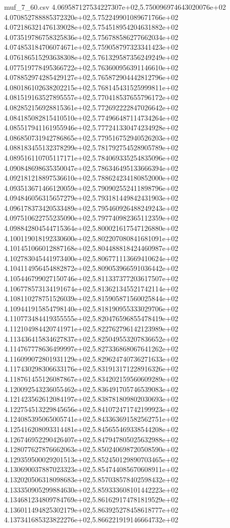 \begin{filecontents*}{muf_7_60.csv}
4.069587127534227307e+02,5.750096974643020076e+02
4.070852788885372320e+02,5.752249901089671766e+02
4.072186321476139028e+02,5.754518954204631882e+02
4.073519786758325836e+02,5.756788586277662034e+02
4.074853184706074671e+02,5.759058797323341423e+02
4.076186515293638308e+02,5.761329587356249249e+02
4.077519778495366722e+02,5.763600956391146610e+02
4.078852974285429127e+02,5.765872904442812796e+02
4.080186102638202215e+02,5.768145431525999811e+02
4.081519163527895557e+02,5.770418537655796172e+02
4.082852156928815361e+02,5.772692222847026642e+02
4.084185082815410510e+02,5.774966487114734264e+02
4.085517941161955946e+02,5.777241330474234928e+02
4.086850731942786865e+02,5.779516752940526203e+02
4.088183455132378299e+02,5.781792754528905789e+02
4.089516110705117171e+02,5.784069335254835096e+02
4.090848698635350047e+02,5.786346495133666394e+02
4.092181218897536610e+02,5.788624234180852000e+02
4.093513671466120059e+02,5.790902552411898796e+02
4.094846056315657279e+02,5.793181449842431903e+02
4.096178373420533489e+02,5.795460926488249243e+02
4.097510622755235090e+02,5.797740982365112359e+02
4.098842804544715364e+02,5.800021617547126880e+02
4.100119018192330600e+02,5.802207080841681091e+02
4.101451066012887168e+02,5.804488818424460987e+02
4.102783045441973400e+02,5.806771113669410624e+02
4.104114956454882872e+02,5.809053966591036442e+02
4.105446799027150746e+02,5.811337377203617507e+02
4.106778573134191674e+02,5.813621345521742114e+02
4.108110278751526039e+02,5.815905871560025844e+02
4.109441915854798140e+02,5.818190955333029706e+02
4.110773484419355555e+02,5.820476596855478419e+02
4.112104984420741971e+02,5.822762796142123989e+02
4.113436415834627837e+02,5.825049553207836652e+02
4.114767778636499997e+02,5.827336868067641262e+02
4.116099072801931129e+02,5.829624740736271633e+02
4.117430298306633176e+02,5.831913171228916326e+02
4.118761455126087867e+02,5.834202159560609289e+02
4.120092543236055462e+02,5.836491705746539083e+02
4.121423562612084197e+02,5.838781809802030693e+02
4.122754513229845656e+02,5.841072471742199923e+02
4.124085395065005741e+02,5.843363691582562751e+02
4.125416208093314481e+02,5.845655469338544208e+02
4.126746952290426407e+02,5.847947805025632988e+02
4.128077627876662063e+02,5.850240698720508590e+02
4.129359500029201513e+02,5.852450129890703465e+02
4.130690037887023323e+02,5.854744085670608911e+02
4.132020506318098683e+02,5.857038578402598432e+02
4.133350905299884630e+02,5.859333608101442223e+02
4.134681234809784769e+02,5.861629174781819529e+02
4.136011494825302179e+02,5.863925278458618777e+02
4.137341685323822276e+02,5.866221919146664732e+02

\end{filecontents*}
